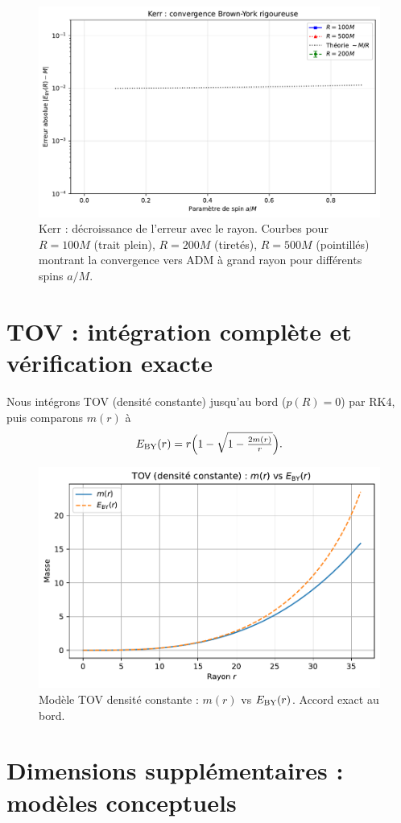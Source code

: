 \documentclass[11pt]{article}
\begin{document}
\begin{figure}[!htb]
\centering
\includegraphics[width=.75\linewidth]{fig_kerr_multiradius.pdf}
\caption{Kerr : d\'ecroissance de l'erreur avec le rayon. Courbes pour $R = 100M$ (trait plein), $R = 200M$ (tiret\'es), $R = 500M$ (pointill\'es) montrant la convergence vers ADM \`a grand rayon pour diff\'erents spins $a/M$.}
\end{figure}
\clearpage

\section{TOV : int\'egration compl\`ete et v\'erification exacte}
Nous int\'egrons TOV (densit\'e constante) jusqu'au bord (\(p(R)=0\)) par RK4, puis comparons $m(r)$ \`a 
\begin{equation}
E_{\rm BY}(r)=r\Big(1-\sqrt{1-\tfrac{2m(r)}{r}}\Big).
\end{equation}
\begin{figure}[!htb]
\centering
\includegraphics[width=.75\linewidth]{fig_tov_full.pdf}
\caption{Mod\`ele TOV densit\'e constante : $m(r)$ vs $E_{\rm BY}(r)$. Accord exact au bord.}
\end{figure}
\clearpage

\section{Dimensions suppl\'ementaires : mod\`eles conceptuels}
\end{document}
